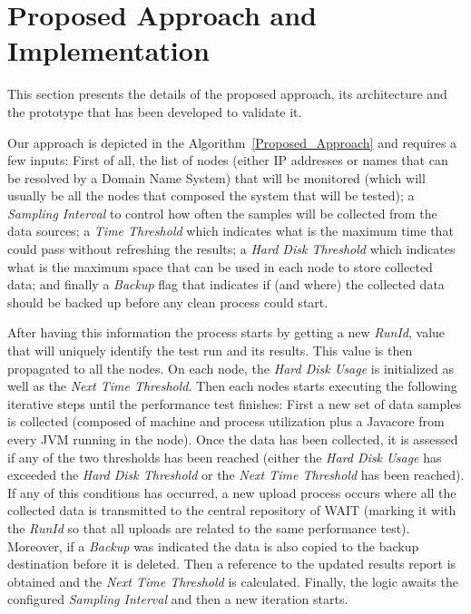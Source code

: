 \documentclass[runningheads,a4paper]{llncs}
\begin{document}
\section{Proposed Approach and Implementation}

This section presents the details of the proposed approach, its architecture
and the prototype that has been developed to validate it.

Our approach is depicted in the Algorithm~\ref{Proposed_Approach} and requires
a few inputs: First of all, the list of nodes (either IP addresses or names that
can be resolved by a Domain Name System) that will be monitored (which
will usually be all the nodes that composed the system that will be tested); a
\emph{Sampling Interval} to control how often the samples will be collected
from the data sources; a \emph{Time Threshold} which indicates what is the
maximum time that could pass without refreshing the results; a \emph{Hard Disk
Threshold} which indicates what is the maximum space that can be used in each
node to store collected data; and finally a \emph{Backup} flag that indicates if
(and where) the collected data should be backed up before any clean process could start.

After having this information the process starts by getting a new \emph{RunId},
value that will uniquely identify the test run and its results. This value is
then propagated to all the nodes. On each node, the \emph{Hard Disk Usage} is
initialized as well as the \emph{Next Time Threshold}. Then each nodes starts
executing the following iterative steps until the performance test finishes:
First a new set of data samples is collected (composed of machine and process
utilization plus a Javacore from every JVM running in the node). Once the data 
has been collected, it is assessed if any of the two thresholds has been reached 
(either the \emph{Hard Disk Usage} has exceeded the \emph{Hard Disk
Threshold} or the \emph{Next Time Threshold} has been reached). If any of this
conditions has occurred, a new upload process occurs where all the collected
data is transmitted to the central repository of WAIT (marking it with the
\emph{RunId} so that all uploads are related to the same performance test).
Moreover, if a \emph{Backup} was indicated the data is also copied to the
backup destination before it is deleted. Then a reference to the updated results
report is obtained and the \emph{Next Time Threshold} is calculated. Finally,
the logic awaits the configured \emph{Sampling Interval} and then a new iteration starts.
\end{document}

